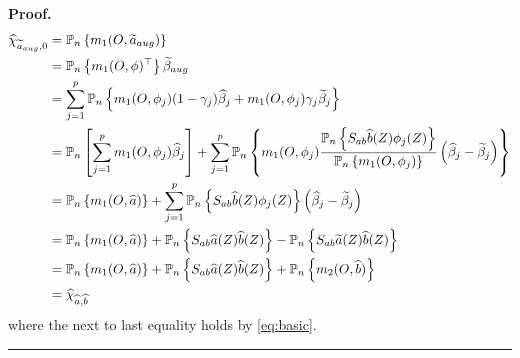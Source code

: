 \documentclass[10pt,a4paper]{amsart}
\newenvironment{proof}[1][Proof]{\noindent\textbf{#1.} }{\ \rule{0.5em}{0.5em}}
\begin{document}
\begin{proof}
\begin{align*}
\widehat{\chi }_{\widetilde{a}_{aug},0}& =\mathbb{P}_{n}\left\{ m_{1}(O,%
\widetilde{a}_{aug})\right\}  \\
& =\mathbb{P}_{n}\left\{ m_{1}(O,\phi )^{\top }\right\} \widetilde{\beta }%
_{aug} \\
& =\sum\limits_{j=1}^{p}\mathbb{P}_{n}\left\{ m_{1}(O,\phi _{j})(1-\gamma
_{j})\widehat{\beta }_{j}+m_{1}(O,\phi _{j})\gamma _{j}\widetilde{\beta }%
_{j}\right\}  \\
& =\mathbb{P}_{n}\left[ \sum\limits_{j=1}^{p}m_{1}(O,\phi _{j})\widehat{%
\beta }_{j}\right] +\sum\limits_{j=1}^{p}\mathbb{P}_{n}\left\{ m_{1}(O,\phi
_{j})\frac{\mathbb{P}_{n}\left\{ S_{ab}\widehat{b}(Z)\phi _{j}(Z)\right\} }{%
\mathbb{P}_{n}\left\{ m_{1}(O,\phi _{j})\right\} }\left( \widehat{\beta }%
_{j}-\widetilde{\beta }_{j}\right) \right\}  \\
& =\mathbb{P}_{n}\left\{ m_{1}(O,\widehat{a})\right\} +\sum\limits_{j=1}^{p}%
\mathbb{P}_{n}\left\{ S_{ab}\widehat{b}(Z)\phi _{j}(Z)\right\} \left( 
\widehat{\beta }_{j}-\widetilde{\beta }_{j}\right)  \\
& =\mathbb{P}_{n}\left\{ m_{1}(O,\widehat{a})\right\} +\mathbb{P}_{n}\left\{
S_{ab}\widehat{a}(Z)\widehat{b}(Z)\right\} -\mathbb{P}_{n}\left\{ S_{ab}%
\widetilde{a}(Z)\widehat{b}(Z)\right\}  \\
& =\mathbb{P}_{n}\left\{ m_{1}(O,\widehat{a})\right\} +\mathbb{P}_{n}\left\{
S_{ab}\widehat{a}(Z)\widehat{b}(Z)\right\} +\mathbb{P}_{n}\left\{ m_{2}(O,%
\widehat{b})\right\}  \\
& =\widehat{\chi }_{\widehat{a},\widehat{b}}
\end{align*}%
where the next to last equality holds by \eqref{eq:basic}.
\end{proof}
\end{document}
